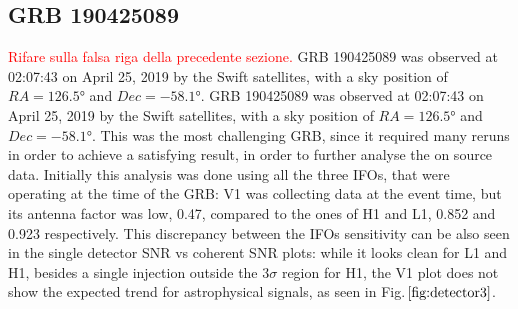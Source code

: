 \documentclass[binding=0.6cm, LaM]{sapthesis}
\newcommand{\fpg}[1]{\textcolor{red}{#1} }
\begin{document}
\subsection{GRB 190425089}
\fpg{Rifare sulla falsa riga della precedente sezione.}
        GRB 190425089 was observed at 02:07:43 on April 25, 2019 by the Swift satellites,
        with a sky position of $RA=\ang{126.5}$ and $Dec=\ang{-58.1}$.
	GRB 190425089 was observed at 02:07:43 on April 25, 2019 by the Swift satellites,
        with a sky position of $RA=\ang{126.5}$ and $Dec=\ang{-58.1}$.
	This was the most challenging GRB, since it required many reruns in order to achieve 
	a satisfying result, in order to further analyse the on source data.
	Initially this analysis was done using all the three IFOs,
        that were operating at the time of the GRB:
        V1 was collecting data at the event time, but its antenna factor was low, 0.47,
        compared to the ones of H1 and L1, 0.852 and 0.923 respectively.
        This discrepancy between the IFOs sensitivity can be also seen in the single detector SNR vs coherent SNR plots:
        while it looks clean for L1 and H1, besides a single injection outside the $3 \sigma$ region for H1,
        the V1 plot does not show the expected trend for astrophysical signals, as seen in Fig.\,$\ref{fig:detector3}$.
\end{document}
